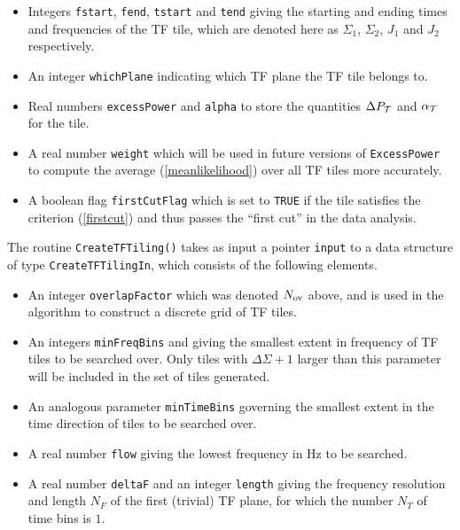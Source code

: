 \documentclass{article}
\begin{document}
\begin{itemize}

\item Integers \verb+fstart+, \verb+fend+, \verb+tstart+ and
\verb+tend+ giving the starting and ending times and frequencies of
the TF tile, which are denoted here as $\Sigma_1$, $\Sigma_2$, $J_1$
and $J_2$ respectively.

\item An integer \verb+whichPlane+ indicating which TF plane the TF
tile belongs to.

\item Real numbers \verb+excessPower+ and \verb+alpha+ to store the
quantities $\Delta P_{\cal T}$ and $\alpha_{\cal T}$ for the tile.

\item A real number \verb+weight+ which will be used in future
versions of \verb+ExcessPower+ to compute the average
(\ref{meanlikelihood}) over all TF tiles more accurately.

\item A boolean flag \verb+firstCutFlag+ which is set to \verb+TRUE+
if the tile satisfies the criterion (\ref{firstcut}) and thus passes
the ``first cut'' in the data analysis.  

\end{itemize}




The routine \verb+CreateTFTiling()+ takes as input a pointer
\verb+input+ to a data structure of type \verb+CreateTFTilingIn+,
which consists of the following elements.

\begin{itemize}

\item An integer \verb+overlapFactor+ which was denoted $N_{\rm ov}$
above, and is used in the algorithm to construct a discrete grid of TF
tiles.

\item An integers \verb+minFreqBins+ and giving the smallest extent in
frequency of TF tiles to be searched over.  Only tiles with $\Delta
\Sigma +1$ larger than this parameter will be included in the set of
tiles generated.

\item An analogous parameter \verb+minTimeBins+ governing the smallest
extent in the time direction of tiles to be searched over.

\item A real number \verb+flow+ giving the lowest frequency in Hz to
be searched.

\item A real number \verb+deltaF+ and an integer \verb+length+ giving
the frequency resolution and length $N_F$ of the first (trivial) TF
plane, for which the number $N_T$ of time bins is $1$.


\end{itemize}
\end{document}
